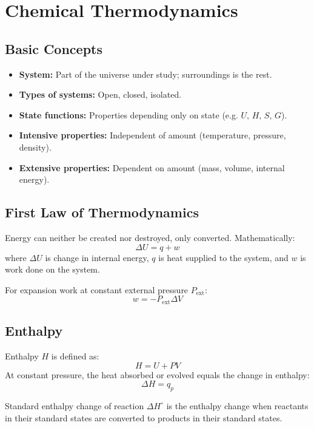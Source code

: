 \documentclass[12pt,a4paper]{article}
\begin{document}
\clearpage


\section{Chemical Thermodynamics}

\subsection{Basic Concepts}

\begin{itemize}
    \item \textbf{System:} Part of the universe under study; surroundings is the rest.
    \item \textbf{Types of systems:} Open, closed, isolated.
    \item \textbf{State functions:} Properties depending only on state (e.g. $U$, $H$, $S$, $G$).
    \item \textbf{Intensive properties:} Independent of amount (temperature, pressure, density).
    \item \textbf{Extensive properties:} Dependent on amount (mass, volume, internal energy).
\end{itemize}

\subsection{First Law of Thermodynamics}
Energy can neither be created nor destroyed, only converted.  
Mathematically:
\[
\Delta U = q + w
\]
where $\Delta U$ is change in internal energy, $q$ is heat supplied to the system, and $w$ is work done on the system.

For expansion work at constant external pressure $P_{\text{ext}}$:
\[
w = -P_{\text{ext}}\Delta V
\]

\subsection{Enthalpy}
Enthalpy $H$ is defined as:
\[
H = U + PV
\]
At constant pressure, the heat absorbed or evolved equals the change in enthalpy:
\[
\Delta H = q_p
\]

Standard enthalpy change of reaction $\Delta H^\circ$ is the enthalpy change when reactants in their standard states are converted to products in their standard states.
\end{document}

